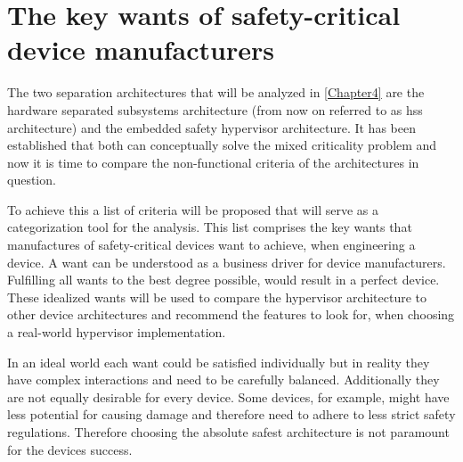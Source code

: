 
\chapter{The key wants of safety-critical device manufacturers} %

\label{Chapter3} %




The two separation architectures that will be analyzed in \ref{Chapter4} are the hardware separated subsystems architecture (from now on referred to as \acrshort{hss} architecture) and the embedded safety hypervisor architecture. It has been established that both can conceptually solve the mixed criticality problem and now it is time to compare the non-functional criteria of the architectures in question. 

To achieve this a list of criteria will be proposed that will serve as a categorization tool for the analysis.
This list comprises the key wants that manufactures of safety-critical devices want to achieve, when engineering a device. A want can be understood as a business driver for device manufacturers. Fulfilling all wants to the best degree possible, would result in a perfect device. These idealized wants will be used to compare the hypervisor architecture to other device architectures and recommend the features to look for, when choosing a real-world hypervisor implementation.

In an ideal world each want could be satisfied individually but in reality they have complex interactions and need to be carefully balanced. 
Additionally they are not equally desirable for every device. Some devices, for example, might have less potential for causing damage and therefore need to adhere to less strict safety regulations. Therefore choosing the absolute safest architecture is not paramount for the devices success.

